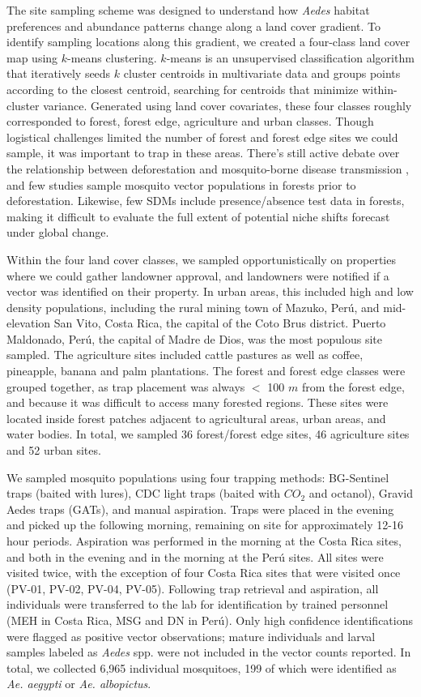 The site sampling scheme was designed to understand how \textit{Aedes} habitat preferences and abundance patterns change along a land cover gradient. To identify sampling locations along this gradient, we created a four-class land cover map using $k$-means clustering. $k$-means is an unsupervised classification algorithm that iteratively seeds $k$ cluster centroids in multivariate data and groups points according to the closest centroid, searching for centroids that minimize within-cluster variance. Generated using land cover covariates, these four classes roughly corresponded to forest, forest edge, agriculture and urban classes. Though logistical challenges limited the number of forest and forest edge sites we could sample, it was important to trap in these areas. There’s still active debate over the relationship between deforestation and mosquito-borne disease transmission \cite{Norris2004-jr, Tucker_Lima2017-fd}, and few studies sample mosquito vector populations in forests prior to deforestation. Likewise, few SDMs include presence/absence test data in forests, making it difficult to evaluate the full extent of potential niche shifts forecast under global change.

Within the four land cover classes, we sampled opportunistically on properties where we could gather landowner approval, and landowners were notified if a vector was identified on their property. In urban areas, this included high and low density populations, including the rural mining town of Mazuko, Perú, and mid-elevation San Vito, Costa Rica, the capital of the Coto Brus district. Puerto Maldonado, Perú, the capital of Madre de Dios, was the most populous site sampled. The agriculture sites included cattle pastures as well as coffee, pineapple, banana and palm plantations. The forest and forest edge classes were grouped together, as trap placement was always $<$ 100 $m$ from the forest edge, and because it was difficult to access many forested regions. These sites were located inside forest patches adjacent to agricultural areas, urban areas, and water bodies. In total, we sampled 36 forest/forest edge sites, 46 agriculture sites and 52 urban sites.

We sampled mosquito populations using four trapping methods: BG-Sentinel traps (baited with lures), CDC light traps (baited with $CO_2$ and octanol), Gravid Aedes traps (GATs), and manual aspiration. Traps were placed in the evening and picked up the following morning, remaining on site for approximately 12-16 hour periods. Aspiration was performed in the morning at the Costa Rica sites, and both in the evening and in the morning at the Perú sites. All sites were visited twice, with the exception of four Costa Rica sites that were visited once (PV-01, PV-02, PV-04, PV-05). Following trap retrieval and aspiration, all individuals were transferred to the lab for identification by trained personnel (MEH in Costa Rica, MSG and DN in Perú). Only high confidence identifications were flagged as positive vector observations; mature individuals and larval samples labeled as \textit{Aedes} spp. were not included in the vector counts reported. In total, we collected 6,965 individual mosquitoes, 199 of which were identified as \textit{Ae. aegypti} or \textit{Ae. albopictus}.

